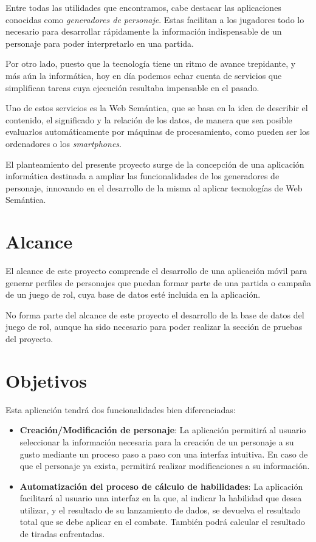 Entre todas las utilidades que encontramos, cabe destacar las aplicaciones 
conocidas como \textit{generadores de personaje}. Estas facilitan a los 
jugadores todo lo necesario para desarrollar rápidamente la información 
indispensable de un personaje para poder interpretarlo en una partida.

Por otro lado, puesto que la tecnología tiene un ritmo de avance trepidante, 
y más aún la informática, hoy en día podemos echar cuenta de servicios 
que simplifican tareas cuya ejecución resultaba impensable en el pasado.
\medskip

Uno de estos servicios es la Web Semántica, que se basa en la idea de 
describir el contenido, el significado y la relación 
de los datos, de manera que sea posible evaluarlos automáticamente por 
máquinas de procesamiento, como pueden ser los ordenadores o los 
\textit{smartphones}.
\medskip

El planteamiento del presente proyecto surge de la concepción de una 
aplicación informática destinada a ampliar las funcionalidades de 
los generadores de personaje, innovando en el desarrollo de la misma 
al aplicar tecnologías de Web Semántica.\medskip


\section{Alcance}
El alcance de este proyecto comprende el desarrollo de una 
aplicación móvil para generar perfiles de personajes que 
puedan formar parte de una partida o campaña de un juego 
de rol, cuya base de datos esté incluida en la aplicación.

No forma parte del alcance de este proyecto el desarrollo 
de la base de datos del juego de rol, aunque ha sido 
necesario para poder realizar la sección de pruebas del
proyecto.

\section{Objetivos}
Esta aplicación tendrá dos funcionalidades bien diferenciadas:
\begin{itemize}
    \item \textbf{Creación/Modificación de personaje}: La 
    aplicación permitirá al usuario seleccionar la información
    necesaria para la creación de un personaje a su gusto 
    mediante un proceso paso a paso con una interfaz intuitiva.
    En caso de que el personaje ya exista, permitirá 
    realizar modificaciones a su información.

    \item \textbf{Automatización del proceso de cálculo 
    de habilidades}: La aplicación facilitará al usuario una 
    interfaz en la que, al indicar la habilidad que desea 
    utilizar, y el resultado de su lanzamiento de dados, se 
    devuelva el resultado total que se debe aplicar en el 
    combate. También podrá calcular el resultado de tiradas 
    enfrentadas.

\end{itemize}


